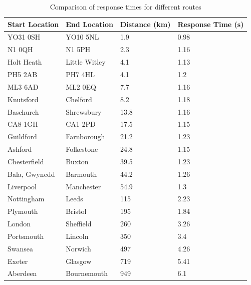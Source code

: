\documentclass[authoryearcitations]{UoYCSproject}
\begin{document}
\begin{table}
	\center
	\caption{Comparison of response times for different routes}
	\label{tab:performanceresults1}
	\begin{tabular}{| l | l | l | l |}
	\hline
	\textbf{Start Location} & \textbf{End Location} & \textbf{Distance (km)} & \textbf{Response Time (s)} \\ \hline
	YO31 0SH & YO10 5NL & 1.9 & 0.98 \\ \hline
	N1 0QH & N1 5PH & 2.3 & 1.16 \\ \hline
	Holt Heath & Little Witley & 4.1 & 1.13 \\ \hline
	PH5 2AB & PH7 4HL & 4.1 & 1.2 \\ \hline
	ML3 6AD & ML2 0EQ & 7.7 & 1.16 \\ \hline 
	Knutsford & Chelford & 8.2 & 1.18 \\ \hline
	Baschurch & Shrewsbury & 13.8 & 1.16 \\ \hline
	CA8 1GH & CA1 2PD & 17.5 & 1.15 \\ \hline
	Guildford & Farnborough & 21.2 & 1.23 \\ \hline
	Ashford & Folkestone & 24.8 & 1.15 \\ \hline
	Chesterfield & Buxton & 39.5 & 1.23 \\ \hline
	Bala, Gwynedd & Barmouth & 44.2 & 1.26 \\ \hline
	Liverpool & Manchester & 54.9 & 1.3 \\ \hline
	Nottingham & Leeds & 115 & 2.23 \\ \hline
	Plymouth & Bristol & 195 & 1.84 \\ \hline
	London & Sheffield & 260 & 3.26 \\ \hline
	Portsmouth & Lincoln & 350 & 3.4 \\ \hline
	Swansea & Norwich & 497 & 4.26 \\ \hline
	Exeter & Glasgow & 719 & 5.41 \\ \hline
	Aberdeen & Bournemouth & 949 & 6.1 \\ \hline
	\end{tabular}
\end{table}
\end{document}
